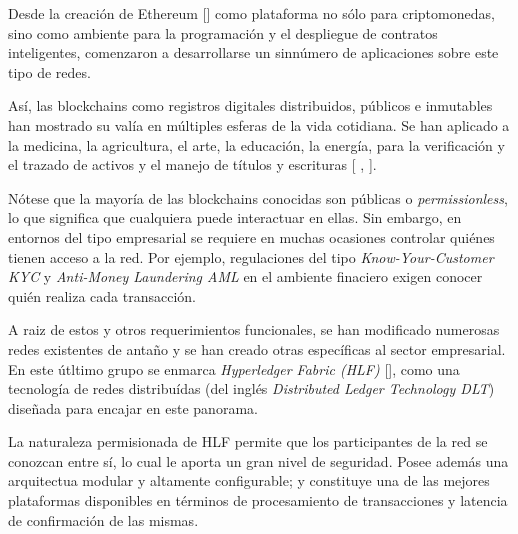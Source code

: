 Desde la creaci\'on de Ethereum [\cite{ethereum2014ethereum}] como plataforma no s\'olo para criptomonedas, sino como ambiente para la programaci\'on y el despliegue de contratos inteligentes, comenzaron a desarrollarse un sinn\'umero de aplicaciones sobre este tipo de redes.

As\'i, las blockchains como registros digitales distribuidos, p\'ublicos e inmutables han mostrado su val\'ia en m\'ultiples esferas de la vida cotidiana. Se han aplicado a la medicina, la agricultura, el arte, la educaci\'on, la energ\'ia, para la verificaci\'on y el trazado de activos y el manejo de t\'itulos y escrituras [\cite{engelhardt2017hitching} , \cite{abou2019blockchain}].



N\'otese que la mayor\'ia de las blockchains conocidas son p\'ublicas o \emph{permissionless}, lo que significa que cualquiera puede interactuar en ellas. Sin embargo, en entornos del tipo empresarial se requiere en muchas ocasiones controlar qui\'enes tienen acceso a la red. Por ejemplo, regulaciones del tipo \emph{Know-Your-Customer KYC} y \emph{Anti-Money Laundering AML} en el ambiente finaciero exigen conocer qui\'en realiza cada transacci\'on. 

A raiz de estos y otros requerimientos funcionales, se han modificado numerosas redes existentes de anta\~no y se han creado otras espec\'ificas al sector empresarial. En este \'utltimo grupo se enmarca \emph{Hyperledger Fabric (HLF)} [\cite{androulaki2018hyperledger}], como una tecnolog\'ia de redes distribu\'idas (del ingl\'es \emph{Distributed Ledger Technology DLT}) dise\~nada para encajar en este panorama.%

La naturaleza permisionada de HLF permite que los participantes de la red se conozcan entre s\'i, lo cual le aporta un gran nivel de seguridad. 
Posee adem\'as una arquitectua modular y altamente configurable; y constituye una de las mejores plataformas disponibles en t\'erminos de procesamiento de transacciones y latencia de confirmaci\'on de las mismas. %

